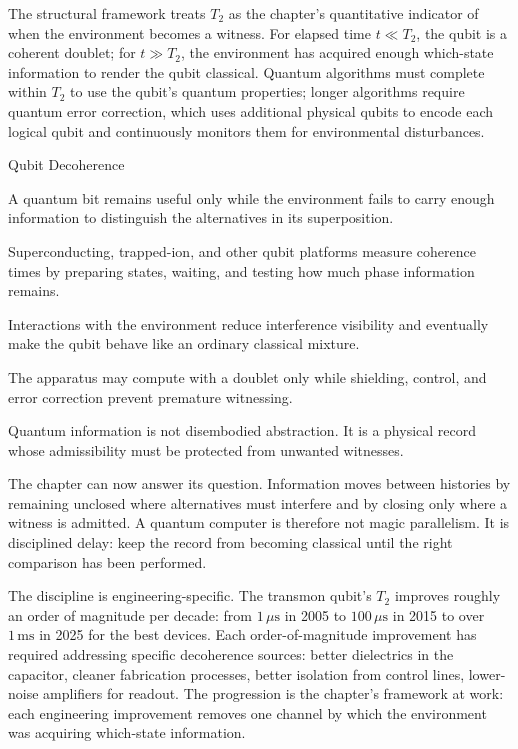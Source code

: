 The structural framework treats $T_2$ as the chapter's quantitative
indicator of when the environment becomes a witness. For elapsed time
$t \ll T_2$, the qubit is a coherent doublet; for $t \gg T_2$, the
environment has acquired enough which-state information to render the
qubit classical. Quantum algorithms must complete within $T_2$ to use
the qubit's quantum properties; longer algorithms require quantum
error correction, which uses additional physical qubits to encode each
logical qubit and continuously monitors them for environmental
disturbances.

\begin{phenom}{Qubit Decoherence}
\label{ph:qubit-decoherence}

\PhStatement A quantum bit remains useful only while the environment fails to
carry enough information to distinguish the alternatives in its superposition.

\PhOrigin Superconducting, trapped-ion, and other qubit platforms measure
coherence times by preparing states, waiting, and testing how much phase
information remains.

\PhObservation Interactions with the environment reduce interference visibility
and eventually make the qubit behave like an ordinary classical mixture.

\PhConstraint The apparatus may compute with a doublet only while shielding,
control, and error correction prevent premature witnessing.

\PhConsequence Quantum information is not disembodied abstraction. It is a
physical record whose admissibility must be protected from unwanted witnesses.

\end{phenom}

The chapter can now answer its question. Information moves between histories
by remaining unclosed where alternatives must interfere and by closing only
where a witness is admitted. A quantum computer is therefore not magic
parallelism. It is disciplined delay: keep the record from becoming classical
until the right comparison has been performed.

The discipline is engineering-specific. The transmon qubit's $T_2$ improves
roughly an order of magnitude per decade: from $1\,\mu\mathrm{s}$ in 2005
to $100\,\mu\mathrm{s}$ in 2015 to over $1\,\mathrm{ms}$ in 2025 for the
best devices. Each order-of-magnitude improvement has required addressing
specific decoherence sources: better dielectrics in the capacitor, cleaner
fabrication processes, better isolation from control lines, lower-noise
amplifiers for readout. The progression is the chapter's framework at
work: each engineering improvement removes one channel by which the
environment was acquiring which-state information.

